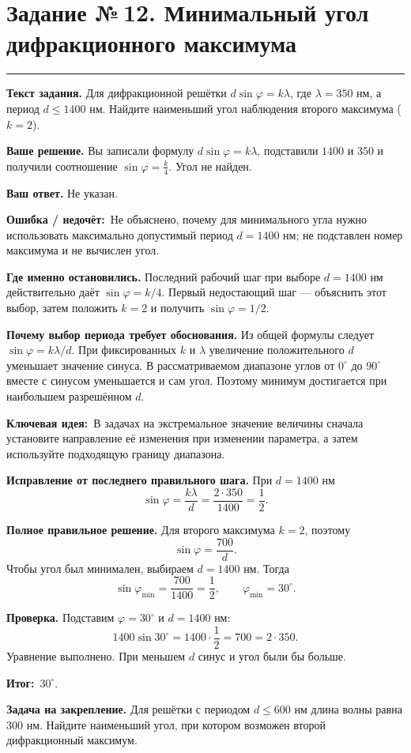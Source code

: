 \documentclass[a4paper,11pt]{article}
\newcommand{\rlabel}[1]{\par\noindent\textbf{\color{darkaccent}#1}\quad}
\newcommand{\errorlabel}{\textcolor{err}{\textbf{Ошибка / недочёт:}}}
\newcommand{\keylabel}{\textcolor{blue!60!black}{\textbf{Ключевая идея:}}}
\newcommand{\finallabel}{\textcolor{teal!60!black}{\textbf{Итог:}}}
\newcommand{\tasktitle}[2]{\clearpage\phantomsection\label{task:#1}\section*{Задание №\,#1. #2}\vspace{-3mm}\textcolor{accent}{\rule{\linewidth}{0.45pt}}}
\begin{document}
\tasktitle{12}{Минимальный угол дифракционного максимума}
\rlabel{Текст задания.} Для дифракционной решётки $d\sin\varphi=k\lambda$, где $\lambda=350$ нм, а период $d\le1400$ нм. Найдите наименьший угол наблюдения второго максимума ($k=2$).
\rlabel{Ваше решение.} Вы записали формулу $d\sin\varphi=k\lambda$, подставили $1400$ и $350$ и получили соотношение $\sin\varphi=\frac{k}{4}$. Угол не найден.
\rlabel{Ваш ответ.} Не указан.
\par\noindent\errorlabel\ Не объяснено, почему для минимального угла нужно использовать максимально допустимый период $d=1400$ нм; не подставлен номер максимума и не вычислен угол.
\rlabel{Где именно остановились.} Последний рабочий шаг при выборе $d=1400$ нм действительно даёт $\sin\varphi=k/4$. Первый недостающий шаг --- объяснить этот выбор, затем положить $k=2$ и получить $\sin\varphi=1/2$.
\rlabel{Почему выбор периода требует обоснования.} Из общей формулы следует $\sin\varphi=k\lambda/d$. При фиксированных $k$ и $\lambda$ увеличение положительного $d$ уменьшает значение синуса. В рассматриваемом диапазоне углов от $0^\circ$ до $90^\circ$ вместе с синусом уменьшается и сам угол. Поэтому минимум достигается при наибольшем разрешённом $d$.
\par\noindent\keylabel\ В задачах на экстремальное значение величины сначала установите направление её изменения при изменении параметра, а затем используйте подходящую границу диапазона.
\rlabel{Исправление от последнего правильного шага.} При $d=1400$ нм
\[
\sin\varphi=\frac{k\lambda}{d}=
\frac{2\cdot350}{1400}=\frac12.
\]
\rlabel{Полное правильное решение.} Для второго максимума $k=2$, поэтому
\[
\sin\varphi=\frac{700}{d}.
\]
Чтобы угол был минимален, выбираем $d=1400$ нм. Тогда
\[
\sin\varphi_{\min}=\frac{700}{1400}=\frac12,
\qquad \varphi_{\min}=30^\circ.
\]
\rlabel{Проверка.} Подставим $\varphi=30^\circ$ и $d=1400$ нм:
\[
1400\sin30^\circ=1400\cdot\frac12=700=2\cdot350.
\]
Уравнение выполнено. При меньшем $d$ синус и угол были бы больше.
\par\noindent\finallabel\ $\boxed{30^\circ}$.
\rlabel{Задача на закрепление.} Для решётки с периодом $d\le600$ нм длина волны равна $300$ нм. Найдите наименьший угол, при котором возможен второй дифракционный максимум.
\end{document}

